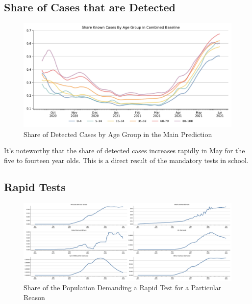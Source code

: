 \FloatBarrier


\subsection{Share of Cases that are Detected  }
\label{subsec:appendix_share_known_cases}

\begin{figure}[ht]
  \centering
  \includegraphics[width=\textwidth]{../figures/results/figures/share_known_cases/full_combined_baseline_by_age_group_rki}
  \caption{Share of Detected Cases by Age Group in the Main Prediction}
  \label{fig:share_known_cases_by_age_group}
  \floatfoot{\noindent}
\end{figure}

It's noteworthy that the share of detected cases increases rapidly in May for the five to
fourteen year olds. This is a direct result of the mandatory tests in
school.

\subsection{Rapid Tests }
\label{subsec:appendix_rapid_tests}

\begin{figure}[ht]
  \centering
  \includegraphics[width=\textwidth]{../figures/results/figures/rapid_test_statistics/demand_shares}
  \caption{Share of the Population Demanding a Rapid Test for a Particular Reason}
  \label{fig:rapid_tests_by_reason}
\end{figure}

